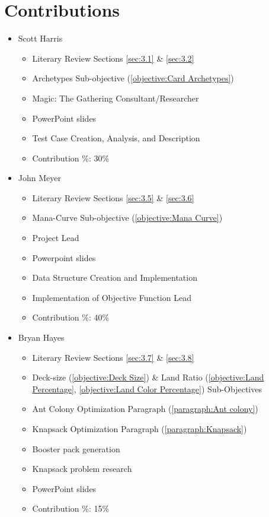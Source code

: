 \documentclass[12pt, letterpaper]{article}
\begin{document}
\section{Contributions}

\begin{itemize}

\item Scott Harris

\begin{itemize}

    \item Literary Review Sections \ref{sec:3.1} \& \ref{sec:3.2}
    \item Archetypes Sub-objective (\ref{objective:Card Archetypes})
    \item Magic: The Gathering Consultant/Researcher
	\item PowerPoint slides
    \item Test Case Creation, Analysis, and Description
    \item Contribution \%: 30\%

\end{itemize}

\item John Meyer

\begin{itemize}

    \item Literary Review Sections \ref{sec:3.5} \& \ref{sec:3.6}
    \item Mana-Curve Sub-objective (\ref{objective:Mana Curve})
    \item Project Lead
	\item Powerpoint slides
    \item Data Structure Creation and Implementation
    \item Implementation of Objective Function Lead
    \item Contribution \%: 40\%

\end{itemize}

\item Bryan Hayes

\begin{itemize}

    \item Literary Review Sections \ref{sec:3.7} \& \ref{sec:3.8}
    \item Deck-size (\ref{objective:Deck Size}) \&
        Land Ratio (\ref{objective:Land Percentage}, \ref{objective:Land Color Percentage}) Sub-Objectives
    \item Ant Colony Optimization Paragraph (\ref{paragraph:Ant colony})
	\item Knapsack Optimization Paragraph (\ref{paragraph:Knapsack})
	\item Booster pack generation
	\item Knapsack problem research
	\item PowerPoint slides
    \item Contribution \%: 15\%


\end{itemize}
\end{itemize}
\end{document}
